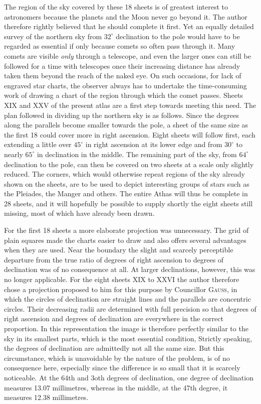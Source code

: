 The region of the sky covered by these 18 sheets is of greatest interest to astronomers because the planets and the Moon never go beyond it. The author therefore rightly believed that he should complete it first. Yet an equally detailed survey of the northern sky from $32^\circ$ declination to the pole would have to be regarded as essential if only because comets so often pass through it. Many comets are visible \emph{only} through a telescope, and even the larger ones can still be followed for a time with telescopes once their increasing distance has already taken them beyond the reach of the naked eye. On such occasions, for lack of engraved star charts, the observer always has to undertake the time-consuming work of drawing a chart of the region through which the comet passes. Sheets XIX and XXV of the present atlas are a first step towards meeting this need. The plan followed in dividing up the northern sky is as follows. Since the degrees along the parallels become smaller towards the pole, a sheet of the same size as the first 18 could cover more in right ascension. Eight sheets will follow first, each extending a little over $45^\circ$ in right ascension at its lower edge and from $30^\circ$ to nearly $65^\circ$ in declination in the middle. The remaining part of the sky, from $64^\circ$ declination to the pole, can then be covered on two sheets at a scale only slightly reduced. The corners, which would otherwise repeat regions of the sky already shown on the sheets, are to be used to depict interesting groups of stars such as the Pleiades, the Manger and others. The entire Athas will thus be complete in 28 sheets, and it will hopefully be possible to supply shortly the eight sheets still missing, most of which have already been drawn.

For the first 18 sheets a more elaborate projection was unnecessary. The grid of plain squares made the charts easier to draw and also offers several advantages when they are used. Near the boundary the slight and scarcely perceptible departure from the true ratio of degrees of right ascension to degrees of declination was of no consequence at all. At larger declinations, however, this was no longer applicable. For the eight sheets XIX to XXVI the author therefore chose a projection proposed to him for this purpose by Councillor \textsc{Gauss}, in which the circles of declination are straight lines and the parallels are concentric circles. Their decreasing radii are determined with full precision so that degrees of right ascension and degrees of declination are everywhere in the correct proportion. In this representation the image is therefore perfectly similar to the sky in its smallest parts, which is the most essential condition, Strictly speaking, the degrees of declination are admittedly not all the same size. But this circumstance, which is unavoidable by the nature of the problem, is of no consequence here, especially since the difference is so small that it is scarcely noticeable. At the 64th and 3oth degrees of declination, one degree of declination measures 13.07 millimetres, whereas in the middle, at the 47th degree, it measures 12.38 millimetres.


